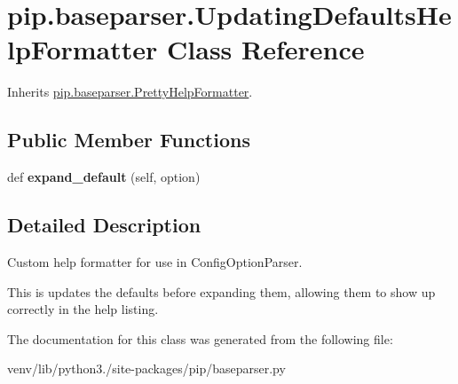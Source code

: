 \hypertarget{classpip_1_1baseparser_1_1_updating_defaults_help_formatter}{}\section{pip.\+baseparser.\+Updating\+Defaults\+Help\+Formatter Class Reference}
\label{classpip_1_1baseparser_1_1_updating_defaults_help_formatter}


Inherits \hyperlink{classpip_1_1baseparser_1_1_pretty_help_formatter}{pip.\+baseparser.\+Pretty\+Help\+Formatter}.

\subsection*{Public Member Functions}
\begin{DoxyCompactItemize}
\item 
\mbox{\label{classpip_1_1baseparser_1_1_updating_defaults_help_formatter_a23f86695c39031e3366f83cda58ed0e7}} 
def {\bfseries expand\+\_\+default} (self, option)
\end{DoxyCompactItemize}


\subsection{Detailed Description}
\begin{DoxyVerb}Custom help formatter for use in ConfigOptionParser.

This is updates the defaults before expanding them, allowing
them to show up correctly in the help listing.
\end{DoxyVerb}
 

The documentation for this class was generated from the following file\+:\begin{DoxyCompactItemize}
\item 
venv/lib/python3./site-\/packages/pip/baseparser.\+py\end{DoxyCompactItemize}
